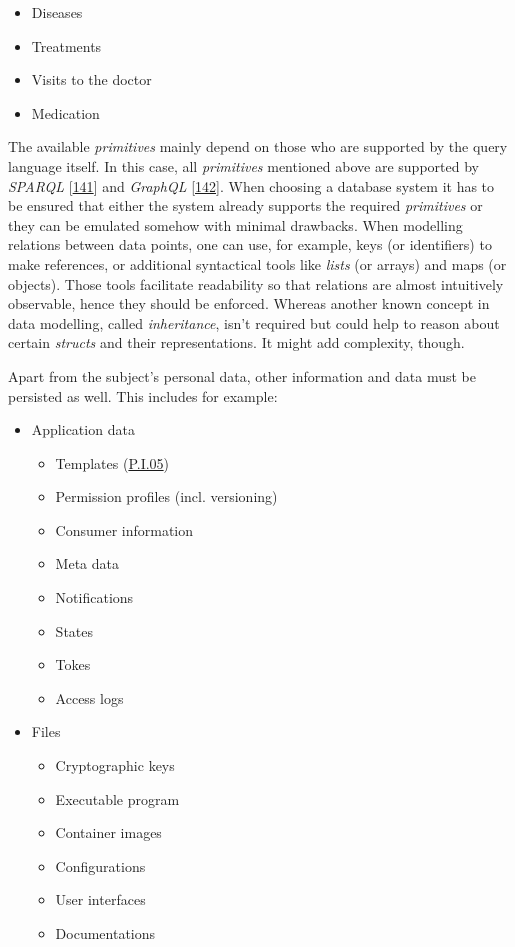 \documentclass[12pt,english,a4paper,titlepage,cleardoublepage=empty,dottedtoc]{report}
\providecommand{\tightlist}{%
  \setlength{\itemsep}{0pt}\setlength{\parskip}{0pt}}
\begin{document}
\begin{itemize}
  \begin{itemize}
  \tightlist
  \item
    Diseases
  \item
    Treatments
  \item
    Visits to the doctor
  \item
    Medication
  \end{itemize}
\end{itemize}

The available \emph{primitives} mainly depend on those who are supported
by the query language itself. In this case, all \emph{primitives}
mentioned above are supported by \emph{SPARQL}
{[}\protect\hyperlink{ref-web_spec_xml_types}{141}{]} and \emph{GraphQL}
{[}\protect\hyperlink{ref-web_spec_graphql_types}{142}{]}. When choosing
a database system it has to be ensured that either the system already
supports the required \emph{primitives} or they can be emulated somehow
with minimal drawbacks. When modelling relations between data points,
one can use, for example, keys (or identifiers) to make references, or
additional syntactical tools like \emph{lists} (or arrays) and maps (or
objects). Those tools facilitate readability so that relations are
almost intuitively observable, hence they should be enforced. Whereas
another known concept in data modelling, called \emph{inheritance},
isn't required but could help to reason about certain \emph{structs} and
their representations. It might add complexity, though.

Apart from the subject's personal data, other information and data must
be persisted as well. This includes for example:

\begin{itemize}
\tightlist
\item
  Application data

  \begin{itemize}
  \tightlist
  \item
    Templates (\protect\hyperlink{pi05}{P.I.05})
  \item
    Permission profiles (incl. versioning)
  \item
    Consumer information
  \item
    Meta data
  \item
    Notifications
  \item
    States
  \item
    Tokes
  \item
    Access logs
  \end{itemize}
\item
  Files

  \begin{itemize}
  \tightlist
  \item
    Cryptographic keys
  \item
    Executable program
  \item
    Container images
  \item
    Configurations
  \item
    User interfaces
  \item
    Documentations
  \end{itemize}
\end{itemize}
\end{document}
